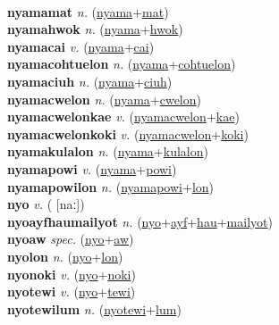  \label{nyamamailyot} \\
\textbf{nyamamat} \textit{n.} (\hyperref[nyama]{nyama}+\hyperref[mat]{mat})
 \label{nyamamat} \\
\textbf{nyamahwok} \textit{n.} (\hyperref[nyama]{nyama}+\hyperref[hwok]{hwok})
 \label{nyamahwok} \\
\textbf{nyamacai} \textit{v.} (\hyperref[nyama]{nyama}+\hyperref[cai]{cai})
 \label{nyamacai} \\
\textbf{nyamacohtuelon} \textit{n.} (\hyperref[nyama]{nyama}+\hyperref[cohtuelon]{cohtuelon})
 \label{nyamacohtuelon} \\
\textbf{nyamaciuh} \textit{n.} (\hyperref[nyama]{nyama}+\hyperref[ciuh]{ciuh})
 \label{nyamaciuh} \\
\textbf{nyamacwelon} \textit{n.} (\hyperref[nyama]{nyama}+\hyperref[cwelon]{cwelon})
 \label{nyamacwelon} \\
\textbf{nyamacwelonkae} \textit{v.} (\hyperref[nyamacwelon]{nyamacwelon}+\hyperref[kae]{kae})
 \label{nyamacwelonkae} \\
\textbf{nyamacwelonkoki} \textit{v.} (\hyperref[nyamacwelon]{nyamacwelon}+\hyperref[koki]{koki})
 \label{nyamacwelonkoki} \\
\textbf{nyamakulalon} \textit{n.} (\hyperref[nyama]{nyama}+\hyperref[kulalon]{kulalon})
 \label{nyamakulalon} \\
\textbf{nyamapowi} \textit{v.} (\hyperref[nyama]{nyama}+\hyperref[powi]{powi})
 \label{nyamapowi} \\
\textbf{nyamapowilon} \textit{n.} (\hyperref[nyamapowi]{nyamapowi}+\hyperref[lon]{lon})
 \label{nyamapowilon} \\
\textbf{nyo} \textit{v.} ( [naː])
 \label{nyo} \\
\textbf{nyoayfhaumailyot} \textit{n.} (\hyperref[nyo]{nyo}+\hyperref[ayf]{ayf}+\hyperref[hau]{hau}+\hyperref[mailyot]{mailyot})
 \label{nyoayfhaumailyot} \\
\textbf{nyoaw} \textit{spec.} (\hyperref[nyo]{nyo}+\hyperref[aw]{aw})
 \label{nyoaw} \\
\textbf{nyolon} \textit{n.} (\hyperref[nyo]{nyo}+\hyperref[lon]{lon})
 \label{nyolon} \\
\textbf{nyonoki} \textit{v.} (\hyperref[nyo]{nyo}+\hyperref[noki]{noki})
 \label{nyonoki} \\
\textbf{nyotewi} \textit{v.} (\hyperref[nyo]{nyo}+\hyperref[tewi]{tewi})
 \label{nyotewi} \\
\textbf{nyotewilum} \textit{n.} (\hyperref[nyotewi]{nyotewi}+\hyperref[lum]{lum})
